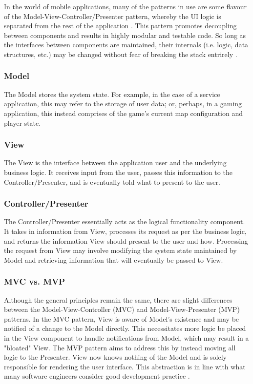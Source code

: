 In the world of mobile applications, many of the patterns in use are some flavour of the Model-View-Controller/Presenter pattern, whereby the UI logic is separated from the rest of the application \cite{Vasiliy}. This pattern promotes decoupling between components and results in highly modular and testable code. So long as the interfaces between components are maintained, their internals (i.e. logic, data structures, etc.) may be changed without fear of breaking the stack entrirely \cite{Martin}.

\subsubsection{Model}
The Model stores the system state. For example, in the case of a service application, this may refer to the storage of user data; or, perhaps, in a gaming application, this instead comprises of the game's current map configuration and player state.

\subsubsection{View}
The View is the interface between the application user and the underlying business logic. It receives input from the user, passes this information to the Controller/Presenter, and is eventually told what to present to the user.

\subsubsection{Controller/Presenter}
The Controller/Presenter essentially acts as the logical functionality component. It takes in information from View, processes its request as per the business logic, and returns the information View should present to the user and how. Processing the request from View may involve modifying the system state maintained by Model and retrieving information that will eventually be passed to View.

\subsubsection{MVC vs. MVP}
Although the general principles remain the same, there are slight differences between the Model-View-Controller (MVC) and Model-View-Presenter (MVP) patterns. In the MVC pattern, View is aware of Model's existence and may be notified of a change to the Model directly. This necessitates more logic be placed in the View component to handle notifications from Model, which may result in a "bloated" View. The MVP pattern aims to address this by instead moving all logic to the Presenter. View now knows nothing of the Model and is solely responsible for rendering the user interface. This abstraction is in line with what many software engineers consider good development practice \cite{Sommerville}.


